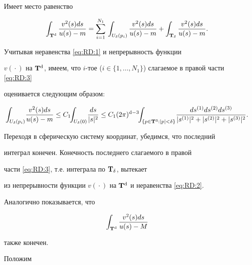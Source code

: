 Имеет место равенство

\begin{equation}

\int_{{\bf T}^{\rm d}} \frac{v^2(s)ds}{u(s)-m}

=\sum_{i=1}^{N_1}\, \int_{U_\delta(p_i)}

\frac{v^2(s)ds}{u(s)-m}+ \int_{{\bf T}_\delta}

\frac{v^2(s)ds}{u(s)-m}. \label{eq:RD:3}

\end{equation}



Учитывая неравенства \eqref{eq:RD:1} и непрерывность функции

$v({}\cdot{})$ на ${\bf T}^{\rm d}$, имеем, что $i$-тое ($i\in \{1,

\dots, N_1 \}$) слагаемое в правой части \eqref{eq:RD:3}

оценивается следующим образом:

$$

\int _{U_\delta(p_i)} \! \frac{v^2(s)ds}{u(s)-m} \leq C_1 \!\!

\int _{U_\delta(0)} \! \frac{ds}{|s|^2} \leq C_1  (2 \pi)^{{\rm

d}-3} \!\! \int _{ \{p \in {\bf T}^3 : |p| < \delta\} } \!

\frac{ds^{(1)} ds^{(2)}

ds^{(3)}}{|s^{(1)}|^2+|s^{(2)}|^2+|s^{(3)}|^2}.

$$



Переходя в сферическую систему координат, убедимся, что последний

интеграл конечен. Конечность последнего слагаемого в правой

части \eqref{eq:RD:3}, т.е. интеграла по ${\bf T}_\delta$, вытекает

из непрерывности функции $v({}\cdot{})$ на ${\bf T}^{\rm d}$ и неравенства \eqref{eq:RD:2}. 

Аналогично показывается, что

\begin{equation}

\int _{{\bf T}^{\rm d}} \frac{v^{2}(s)ds}{u(s)-M}

\label{eq:RD:4}

\end{equation}

также конечен.



Положим


